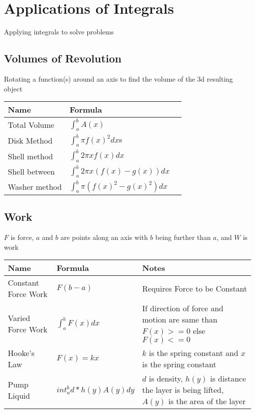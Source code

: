 \documentclass[17pt]{extarticle}
\begin{document}
\section{Applications of Integrals}
Applying integrals to solve problems
\subsection{Volumes of Revolution}
Rotating a function(s) around an axis to find the volume of the 3d resulting object
\renewcommand{\arraystretch}{2}
\begin{table}[H]
\centering
\begin{tabular}{|l|l|l|}
\hline
\rowcolor{githublightgray}
Name & Formula\\
\hline
Total Volume & $\int_{a}^{b}A(x)$\\
\hline
Disk Method &$\int_{a}^{b}\pi f(x)^2dx$s\\
\hline
Shell method &$\int_{a}^{b}2\pi xf(x)dx$\\
\hline
Shell between &$\int_{a}^{b}2\pi x(f(x)-g(x))dx$\\
\hline
Washer method &$\int_{a}^{b}\pi(f(x)^2-g(x)^2)dx$\\
\hline
\end{tabular}
\end{table}

\clearpage
\subsection{Work}
$F$ is force, $a$ and $b$ are points along an axis with $b$ being further than $a$, and $W$ is work\\
\renewcommand{\arraystretch}{2}
\begin{table}[H]
\centering
\begin{tabular}{|l|l|l|}
\hline
\rowcolor{githublightgray}
Name & Formula & Notes\\
\hline
Constant Force Work&$F(b-a)$&Requires Force to be Constant\\
\hline
Varied Force Work&$\int_{a}^{b}F(x)dx$&\makecell[l]{If direction of force and motion are \\same than $F(x)>=0$ else $F(x)<=0$}\\
\hline
Hooke's Law&$F(x)=kx$&\makecell[l]{$k$ is the spring constant and $x$ is the \\spring constant}\\
\hline
Pump Liquid&$int_{a}^{b}d*h(y)A(y)dy$&\makecell[l]{$d$ is density, $h(y)$ is distance the layer\\ is being lifted, $A(y)$ is the area of the \\layer}\\
\hline
\end{tabular} 
\end{table}
\end{document}
